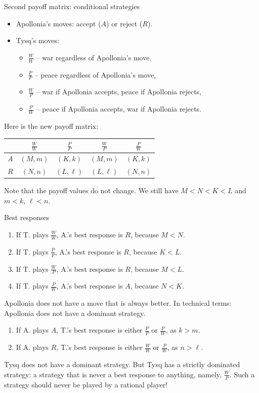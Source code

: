 \documentclass[compress]{beamer}
\begin{document}
\begin{frame}{Second payoff matrix: conditional strategies}

\begin{itemize}
\item Apollonia's moves: accept ($A$) or reject ($R$).
\item Tysq's moves:
\begin{itemize}  
\item $\frac{W}{W}$ -- war regardless of Apollonia's move,
\item $\frac{P}{P}$ -- peace regardless of Apollonia's move,
\item $\frac{W}{P}$ -- war if Apollonia accepts, peace if Apollonia rejects,
\item $\frac{P}{W}$ -- peace if Apollonia accepts, war if Apollonia rejects.
\end{itemize}
\end{itemize}
Here is the new payoff matrix:
\begin{center}
\begin{tabular}{c|cccc}
  & $\frac{W}{W}$ & $\frac{P}{P}$ & $\frac{W}{P}$ & $\frac{P}{W}$ \\
\hline
$A$ & $(M,m)$     & $(K,k)$       & $(M,m)$       & $(K,k)$  \\
$R$ & $(N,n)$     & $(L,\ell)$    & $(L,\ell)$    & $(N,n)$  
\end{tabular}
\end{center}
Note that the payoff values do not change. We still have
$M<N<K<L$ and $m < k$, $\ell < n$.
\end{frame}

\begin{frame}{Best responses}

\begin{enumerate}
\item If T. plays $\frac{W}{W}$, A.'s best response is 
$R$, because $M<N$.
\item If T. plays $\frac{P}{P}$, A.'s best response is
$R$, because $K<L$.
\item If T. plays $\frac{W}{P}$, A.'s best response is 
$R$, because $M<L$.
\item If T. plays $\frac{P}{W}$, A.'s best response is
$A$, because $N<K$.
\end{enumerate}
Apollonia does not have a move that is always better. In technical terms: 
Apollonia does not have a \alert{dominant} strategy. 

\begin{enumerate}
\item If A. plays $A$, T.'s best response is either 
$\frac{P}{P}$ or $\frac{P}{W}$, as $k>m$.
\item If A. plays $R$, T.'s best response is either 
$\frac{W}{W}$ or $\frac{P}{W}$, as $n>\ell$.
\end{enumerate}
Tysq does not have a dominant strategy. But Tysq has
a \alert{strictly dominated} strategy: a strategy that is never a best response
to anything, namely, $\frac{W}{P}$. Such a strategy should never be played by a
rational player!

\end{frame}
\end{document}

